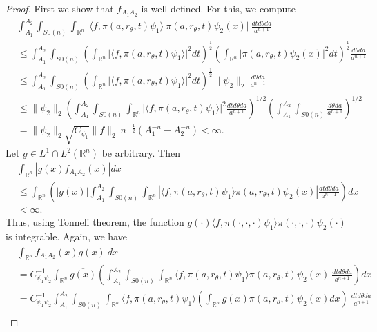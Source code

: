 \documentclass[11pt,reqno]{amsart}
\numberwithin{equation}{section}
\theoremstyle{definition}
\begin{document}
\begin{proof}
First we show that $f_{A_1A_2}$ is well defined. For this, we compute
\begin{align*}
&\int_{A_1}^{A_2}\int_{S0(n)}\int_{\mathbb{R}^n} \big|\langle f, \pi(a,r_{\theta},t)\psi_1\rangle\ \pi(a,r_{\theta},t)\psi_2(x)\big|\ \frac{dtd\theta da}{a^{n+1}}\\
&\leq\int_{A_1}^{A_2}\int_{S0(n)}\left( \int_{\mathbb{R}^n} \big|\langle f, \pi(a,r_{\theta},t)\psi_1\rangle \big|^2 dt\right)^{\frac{1}{2}}\left( \int_{\mathbb{R}^n}\big|\pi(a,r_{\theta},t)\psi_2(x)\big|^2dt \right)^{\frac{1}{2}}\frac{d\theta da}{a^{n+1}}\\
&\leq\int_{A_1}^{A_2}\int_{S0(n)}\left( \int_{\mathbb{R}^n} \big|\langle f, \pi(a,r_{\theta},t)\psi_1\rangle \big|^2 dt\right)^{\frac{1}{2}}\|\psi_2\|_{2}\ \frac{d\theta da}{a^{n+1}}\\
&\leq \|\psi_2\|_{2}\left(\int_{A_1}^{A_2}\int_{S0(n)}\int_{\mathbb{R}^n} \big|\langle f, \pi(a,r_{\theta},t)\psi_1\rangle \big|^2 \frac{ dtd\theta da}{a^{n+1}}\right)^{1/2}\left(\int_{A_1}^{A_2}\int_{S0(n)}\frac{d\theta da}{a^{n+1}} \right)^{1/2}\\
&=\|\psi_2\|_{2}\sqrt{C_{\psi_1}}\|f\|_2\ n^{-\frac{1}{2}}(A_1^{-n}-A_2^{-n})< \infty.
\end{align*}
Let $g\in  L^1\cap L^2(\mathbb{R}^n)$ be arbitrary. Then 
\begin{align*}
&\int_{\mathbb{R}^n} \left|g(x)f_{A_1A_2}(x)\right|dx \\
&\leq \int_{\mathbb{R}^n}\left(|g(x)| \int_{A_1}^{A_2}\int_{S0(n)}\int_{\mathbb{R}^n} |\langle f, \pi(a,r_{\theta},t)\psi_1\rangle \pi(a,r_{\theta},t)\psi_2(x)|\frac{dtd\theta da}{a^{n+1}}    \right)dx\\
& < \infty.
\end{align*}
Thus, using Tonneli theorem, the function  $g(\cdot)\langle f, \pi(\cdot,\cdot,\cdot)\psi_1\rangle \pi(\cdot,\cdot,\cdot)\psi_2(\cdot) $ is integrable.
Again, we have
\begin{align*}
& \int_{\mathbb{R}^n} f_{A_1A_2}(x)\overline{g(x)}\ dx \\
 &= C_{\psi_1\psi_2}^{-1} \int_{\mathbb{R}^n}\overline{g(x)}\left(\int_{A_1}^{A_2}\int_{S0(n)}\int_{\mathbb{R}^n} \langle f, \pi(a,r_{\theta},t)\psi_1\rangle \pi(a,r_{\theta},t)\psi_2(x)\ \frac{dtd\theta da}{a^{n+1}}\right)dx\\
 &=C_{\psi_1\psi_2}^{-1}\int_{A_1}^{A_2}\int_{S0(n)}\int_{\mathbb{R}^n} \langle f, \pi(a,r_{\theta},t)\psi_1\rangle\left(\int_{\mathbb{R}^n}\overline{g(x)}\pi(a,r_{\theta},t)\psi_2(x)dx\right)\ \frac{dtd\theta da}{a^{n+1}}\\

\end{align*}
\end{proof}
\end{document}
